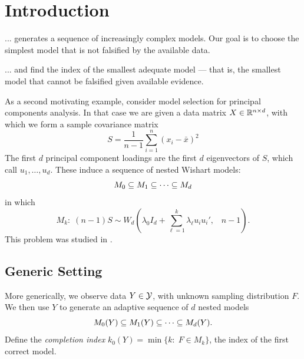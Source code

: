 \documentclass{article}
\begin{document}
\section{Introduction}

... generates a sequence of increasingly complex models. Our goal is to choose the simplest model that is not falsified by the available data.

... and find the index of the smallest adequate model --- that is, the smallest model that cannot be falsified given available evidence.

\begin{example}
  \citet{taylor2014exact}
\end{example}

\begin{example}
  \citet{taylor2014exact}
\end{example}

\begin{example}
  \citet{taylor2014exact}
\end{example}

\begin{example}
  As a second motivating example, consider model selection for   principal components analysis. In that case we are given a data matrix $X \in \mathbb{R}^{n\times d}$, with which we form a sample covariance matrix
\[
S = \frac{1}{n-1} \sum_{i=1}^n(x_i - \bar x)^2
\]
The first $d$ principal component loadings are the first $d$ eigenvectors of $S$, which call $u_1,\ldots, u_d$. These induce a sequence of nested Wishart models:
\[
M_0 \subseteq M_1 \subseteq \cdots \subseteq M_d
\]
in which
\begin{equation}
  M_k:\; (n-1) S \sim W_d\left(\lambda_0 I_d + \sum_{\ell=1}^k     \lambda_\ell u_i u_i', \;\;\; n-1\right).
\end{equation}
This problem was studied in \citet{choi2014selecting}.
\end{example}

\subsection{Generic Setting}

More generically, we observe data $Y \in \mathcal{Y}$, with unknown sampling distribution $F$. We then use $Y$ to generate an adaptive sequence of $d$ nested models
\[
M_0(Y) \subseteq M_1(Y) \subseteq \cdots \subseteq M_d(Y).
\]
Define the {\em completion index} $k_0(Y) = \min\{k:\; F \in M_k\}$, the index of the first correct model. 
\end{document}
